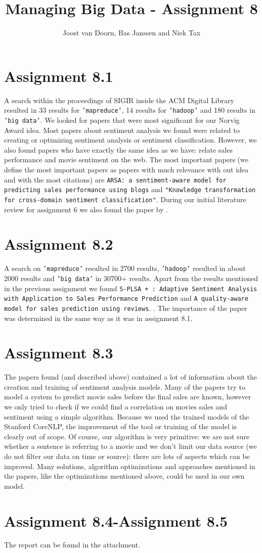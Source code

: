\documentclass[]{article}
\title{Managing Big Data - Assignment 8}
\author{Joost van Doorn, Bas Janssen and Niek Tax}
\begin{document}
\maketitle

\section*{Assignment 8.1}
A search within the proceedings of SIGIR inside the ACM Digital Library resulted in 33 results for \texttt{'mapreduce'}, 14 results for \texttt{'hadoop'} and 180 results in \texttt{'big data'}. We looked for papers that were most significant for our Norvig Award idea. Most papers about sentiment analysis we found were related to creating or optimizing sentiment analysis or sentiment classification. However, we also found papers who have exactly the same idea as we have: relate sales performance and movie sentiment on the web. The most important papers (we define the most important papers as papers with much relevance with out idea and with the most citations) are \texttt{ARSA: a sentiment-aware model for predicting sales performance using blogs}\cite{Liu2007} and \texttt{"Knowledge transformation for cross-domain sentiment classification"}\cite{Li2009}. During our initial literature review for assignment 6 we also found the paper by \cite{Liu2007}.

\section*{Assignment 8.2}
A search on \texttt{'mapreduce'} resulted in 2700 results, \texttt{'hadoop'} resulted in about 2000 results and \texttt{'big data'} in 30700+ results. Apart from the results mentioned in the previous assignment we found \texttt{S-PLSA + : Adaptive Sentiment Analysis with Application to Sales Performance Prediction}\cite{Liu} and \texttt{A quality-aware model for sales prediction using reviews}. \cite{Yu2010}. The importance of the paper was determined in the same way as it was in assignment 8.1.

\section*{Assignment 8.3}
The papers found (and described above) contained a lot of information about the creation and training of sentiment analysis models. Many of the papers try to model a system to predict movie sales before the final sales are known, however we only tried to check if we could find a correlation on movies sales and sentiment using a simple algorithm. Because we used the trained models of the Stanford CoreNLP, the improvement of the tool or training of the model is clearly out of scope. Of course, our algorithm is very primitive: we are not sure whether a sentence is referring to a movie and we don't limit our data source (we do not filter our data on time or source): there are lots of aspects which can be improved. Many solutions, algorithm optimizations and approaches mentioned in the papers, like the optimizations mentioned above, could be used in our own model.

\section*{Assignment 8.4-Assignment 8.5}
The report can be found in the attachment.





\end{document}
